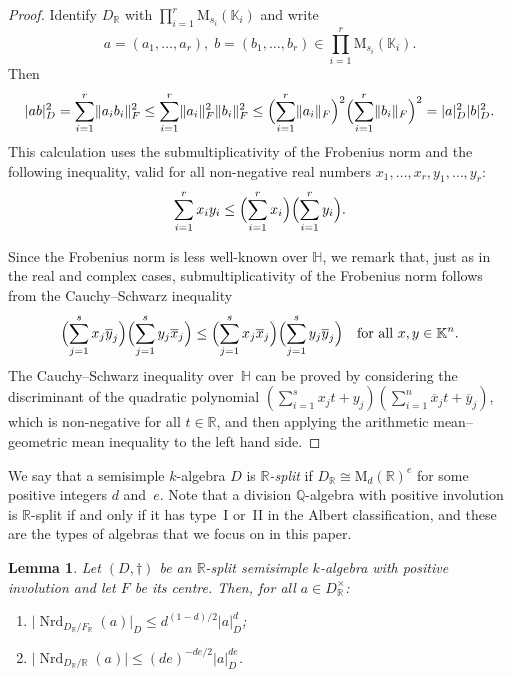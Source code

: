 \documentclass[11pt]{article}
\numberwithin{equation}{section}
\newenvironment{enumeratei}
{\bgroup\def\theenumi{\roman{enumi}}\def\theenumii{\alph{enumii}}\begin{enumerate}}
{\end{enumerate}\egroup}
\newcommand{\bH}{\mathbb{H}}
\newcommand{\bK}{\mathbb{K}}
\newcommand{\bQ}{\mathbb{Q}}
\newcommand{\bR}{\mathbb{R}}
\newcommand{\rM}{\mathrm{M}}
\DeclareMathOperator{\Nrd}{Nrd}
\newcommand{\abs}[1]{\lvert #1 \rvert}
\newcommand{\length}[1]{\lVert #1 \rVert}
\let\ov\overline
\newcommand{\defterm}[1]{\emph{#1}}
\newtheorem{lemma}{Lemma}[section]
\begin{document}
\begin{proof}
Identify $D_\bR$ with $\prod_{i=1}^r \rM_{s_i}(\bK_i)$ and write
\[
a = (a_1, \dotsc, a_r), \; b = (b_1, \dotsc, b_r) \in \prod_{i=1}^r \rM_{s_i}(\bK_i).
\]
Then
\[
\abs{ab}_D^2
= \sum_{i=1}^r \length{a_ib_i}_F^2
\leq \sum_{i=1}^r \length{a_i}_F^2 \length{b_i}_F^2
\leq \Bigl( \sum_{i=1}^r \length{a_i}_F \Bigr)^2 \Bigl( \sum_{i=1}^r \length{b_i}_F \Bigr)^2
= \abs{a}_D^2 \abs{b}_D^2.
\]
This calculation uses the submultiplicativity of the Frobenius norm and the following inequality, valid for all non-negative real numbers $x_1, \dotsc, x_r, y_1, \dotsc, y_r$:
\begin{equation} \label{eqn:sum-squares}
\sum_{i=1}^r x_iy_i \leq \Bigl( \sum_{i=1}^r x_i \Bigr) \Bigl( \sum_{i=1}^r y_i \Bigr).
\end{equation}

Since the Frobenius norm is less well-known over $\bH$, we remark that, just as in the real and complex cases, submultiplicativity of the Frobenius norm follows from the Cauchy--Schwarz inequality
\[
\Bigl( \sum_{j=1}^s x_j \ov{y}_j \Bigr) \Bigl( \sum_{j=1}^s y_j \ov{x}_j \Bigr) \leq \Bigl( \sum_{j=1}^s x_j \ov{x}_j \Bigr) \Bigl( \sum_{j=1}^s y_j \ov{y}_j \Bigr) \quad\text{for all } x, y \in \bK^n.
\]
The Cauchy--Schwarz inequality over~$\bH$ can be proved by considering the discriminant of the quadratic polynomial $(\sum_{i=1}^s x_j t + y_j)(\sum_{i=1}^n \ov{x}_j t + \ov{y}_j)$, which is non-negative for all $t \in \bR$, and then applying the arithmetic mean--geometric mean inequality to the left hand side.
\end{proof}

We say that a semisimple $k$-algebra $D$ is \defterm{$\bR$-split} if $D_\bR \cong \rM_d(\bR)^e$ for some positive integers $d$ and~$e$.
Note that a division $\bQ$-algebra with positive involution is $\bR$-split if and only if it has type~I or~II in the Albert classification, and these are the types of algebras that we focus on in this paper.

\begin{lemma} \label{Nrd-length-bound}
Let $(D, \dag)$ be an $\bR$-split semisimple $k$-algebra with positive involution and let $F$ be its centre.
Then, for all $a \in D_\bR^\times$:
\begin{enumeratei}
\item $\abs{\Nrd_{D_\bR/F_\bR}(a)}_D \leq d^{(1-d)/2} \abs{a}_D^d$;
\item $\abs{\Nrd_{D_\bR/\bR}(a)} \leq (de)^{-de/2} \abs{a}_D^{de}$.
\end{enumeratei}
\end{lemma}
\end{document}

